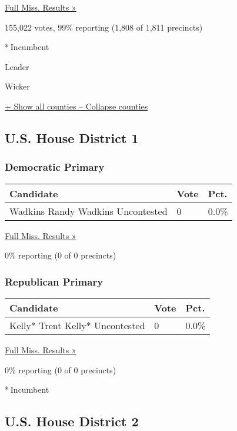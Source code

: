 \href{https://www.nytimes3xbfgragh.onion/elections/results/mississippi}{Full
Miss. Results »}

155,022 votes, 99\% reporting (1,808 of 1,811 precincts)

* Incumbent

Leader

 Wicker

\protect\hyperlink{}{+ Show all counties -- Collapse counties}

\hypertarget{us-house-district-1}{%
\subsection{U.S. House District 1}\label{us-house-district-1}}

\hypertarget{democratic-primary-1}{%
\subsubsection{Democratic Primary}\label{democratic-primary-1}}

\begin{longtable}[]{@{}lll@{}}
\toprule
Candidate & Vote & Pct.\tabularnewline
\midrule
\endhead
 Wadkins Randy Wadkins Uncontested & 0 & 0.0\%\tabularnewline
\bottomrule
\end{longtable}

\href{https://www.nytimes3xbfgragh.onion/elections/results/mississippi}{Full
Miss. Results »}

0\% reporting (0 of 0 precincts)

\hypertarget{republican-primary-1}{%
\subsubsection{Republican Primary}\label{republican-primary-1}}

\begin{longtable}[]{@{}lll@{}}
\toprule
Candidate & Vote & Pct.\tabularnewline
\midrule
\endhead
 Kelly* Trent Kelly* Uncontested & 0 & 0.0\%\tabularnewline
\bottomrule
\end{longtable}

\href{https://www.nytimes3xbfgragh.onion/elections/results/mississippi}{Full
Miss. Results »}

0\% reporting (0 of 0 precincts)

* Incumbent

\hypertarget{us-house-district-2}{%
\subsection{U.S. House District 2}\label{us-house-district-2}}

